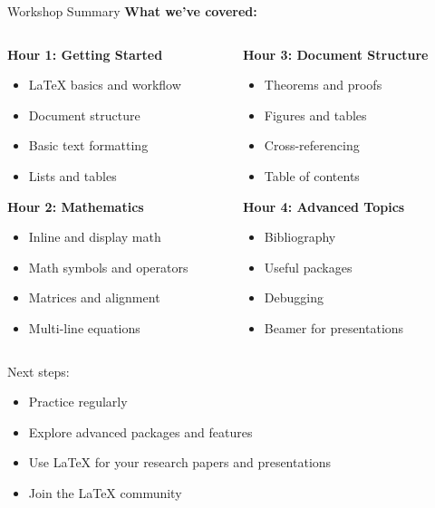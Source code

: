 
\begin{frame}{Workshop Summary}
	\textbf{What we've covered:}
	\begin{columns}
		\begin{column}{0.5\textwidth}
			\textbf{Hour 1: Getting Started}
			\begin{itemize}
				\item LaTeX basics and workflow
				\item Document structure
				\item Basic text formatting
				\item Lists and tables
			\end{itemize}
			
			\textbf{Hour 2: Mathematics}
			\begin{itemize}
				\item Inline and display math
				\item Math symbols and operators
				\item Matrices and alignment
				\item Multi-line equations
			\end{itemize}
		\end{column}
		
		\begin{column}{0.5\textwidth}
			\textbf{Hour 3: Document Structure}
			\begin{itemize}
				\item Theorems and proofs
				\item Figures and tables
				\item Cross-referencing
				\item Table of contents
			\end{itemize}
			
			\textbf{Hour 4: Advanced Topics}
			\begin{itemize}
				\item Bibliography
				\item Useful packages
				\item Debugging
				\item Beamer for presentations
			\end{itemize}
		\end{column}
	\end{columns}
	
	\begin{alertblock}{Next steps:}
		\begin{itemize}
			\item Practice regularly
			\item Explore advanced packages and features
			\item Use LaTeX for your research papers and presentations
			\item Join the LaTeX community
		\end{itemize}
	\end{alertblock}
\end{frame}

